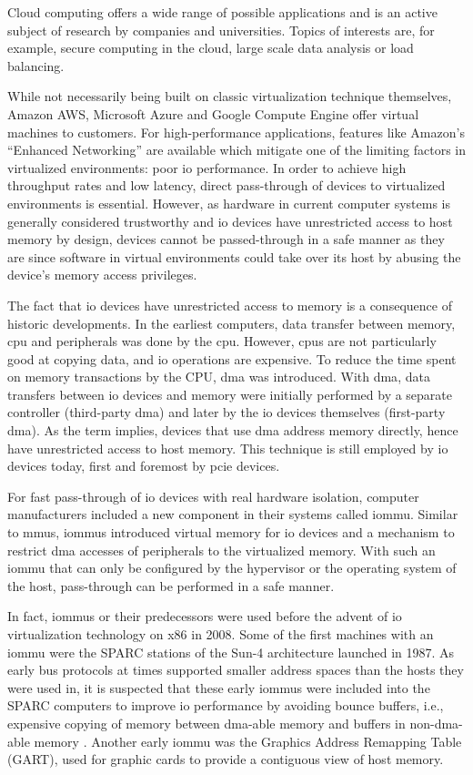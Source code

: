 Cloud computing offers a wide range of possible applications and is an active
subject of research by companies and universities. Topics of interests are, for
example, secure computing in the cloud, large scale data analysis or load
balancing.

While not necessarily being built on classic virtualization technique
themselves, Amazon AWS, Microsoft Azure and Google Compute Engine offer virtual
machines to customers. For high-performance applications, features like Amazon's
``Enhanced Networking'' are available which mitigate one of the limiting factors
in virtualized environments: poor \acs{io} performance. In order to achieve high
throughput rates and low latency, direct pass-through of devices to virtualized
environments is essential. However, as hardware in current computer systems is
generally considered trustworthy and \ac{io} devices have unrestricted access to
host memory by design, devices cannot be passed-through in a safe manner as they
are since software in virtual environments could take over its host by abusing
the device's memory access privileges.

The fact that \ac{io} devices have unrestricted access to memory is a
consequence of historic developments. In the earliest computers, data transfer
between memory, \acs{cpu} and peripherals was done by the \ac{cpu}. However,
\acp{cpu} are not particularly good at copying data, and \ac{io} operations are
expensive. To reduce the time spent on memory transactions by the CPU, \ac{dma}
was introduced. With \ac{dma}, data transfers between \ac{io} devices and memory
were initially performed by a separate controller (third-party \ac{dma}) and
later by the \ac{io} devices themselves (first-party \ac{dma}). As the term
implies, devices that use \ac{dma} address memory directly, hence have
unrestricted access to host memory. This technique is still employed by \ac{io}
devices today, first and foremost by \acs{pcie} devices.

For fast pass-through of \ac{io} devices with real hardware isolation, computer
manufacturers included a new component in their systems called \acf{iommu}.
Similar to \acp{mmu}, \acp{iommu} introduced virtual memory for \ac{io} devices
and a mechanism to restrict \ac{dma} accesses of peripherals to the virtualized
memory. With such an \ac{iommu} that can only be configured by the hypervisor
or the operating system of the host, pass-through can be performed in a safe
manner.

In fact, \acp{iommu} or their predecessors were used before the advent of
\ac{io} virtualization technology on x86 in 2008. Some of the first machines
with an \ac{iommu} were the SPARC stations of the Sun-4 architecture launched in
1987. As early bus protocols at times supported smaller address spaces than the
hosts they were used in, it is suspected that these early \acp{iommu} were
included into the SPARC computers to improve \ac{io} performance by avoiding
bounce buffers, i.e., expensive copying of memory between \ac{dma}-able memory
and buffers in non-\ac{dma}-able memory
\cite[pp.~28~ff.]{rothwell2018exploitation}. Another early \ac{iommu} was the
Graphics Address Remapping Table (GART), used for graphic cards to provide a
contiguous view of host memory.

